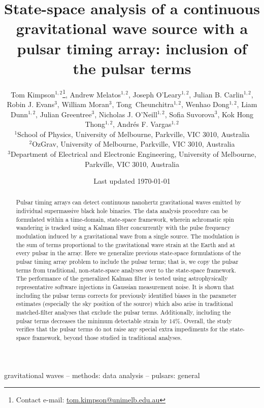 \documentclass[fleqn,usenatbib,useAMS]{mnras}
\title[State-space PTA]{State-space analysis of a continuous gravitational wave source with a pulsar timing array: inclusion of the pulsar terms}
\author[Kimpson]{Tom Kimpson$^{1,2}$\thanks{Contact e-mail: \href{tom.kimpson@unimelb.edu.au}{tom.kimpson@unimelb.edu.au}}, Andrew Melatos$^{1,2}$, Joseph O'Leary$^{1,2}$, Julian B. Carlin$^{1,2}$, Robin J. Evans$^{3}$, \newauthor William Moran$^{3}$, Tong Cheunchitra$^{1,2}$, Wenhao Dong$^{1,2}$, Liam Dunn$^{1,2}$, Julian Greentree$^{3}$, Nicholas J. O'Neill$^{1,2}$, \newauthor Sofia Suvorova$^{3}$, Kok Hong Thong$^{1,2}$, Andrés F. Vargas$^{1,2}$%
\\
$^{1}$School of Physics, University of Melbourne, Parkville, VIC 3010, Australia \\
$^{2}$OzGrav, University of Melbourne, Parkville, VIC 3010, Australia \\
$^{3}$Department of Electrical and Electronic Engineering, University of Melbourne, Parkville, VIC 3010, Australia }
\date{Last updated \today}
\begin{document}
\label{firstpage}
\pagerange{\pageref{firstpage}--\pageref{lastpage}}
\maketitle

\begin{abstract}	
	 Pulsar timing arrays can detect continuous nanohertz gravitational waves emitted by individual supermassive black hole binaries. The data analysis procedure can be formulated within a time-domain, state-space framework, wherein achromatic spin wandering is tracked using a Kalman filter concurrently with the pulse frequency modulation induced by a gravitational wave from a single source. The modulation is the sum of terms proportional to the gravitational wave strain at the Earth and at every pulsar in the array. Here we generalize previous state-space formulations of the pulsar timing array problem to include the pulsar terms; that is, we copy the pulsar terms from traditional, non-state-space analyses over to the state-space framework. The performance of the generalized Kalman filter is tested using astrophysically representative software injections in Gaussian measurement noise. It is shown that including the pulsar terms corrects for previously identified biases in the parameter estimates (especially the sky position of the source) which also arise in traditional matched-filter analyses that exclude the pulsar terms. Additionally, including the pulsar terms decreases the minimum detectable strain by $14\%$. Overall, the study verifies that the pulsar terms do not raise any special extra impediments for the state-space framework, beyond those studied in traditional analyses.
\end{abstract}

\begin{keywords}
gravitational waves -- methods: data analysis -- pulsars: general
\end{keywords}



\begingroup
\let\clearpage\relax
\endgroup
\newpage
\end{document}
